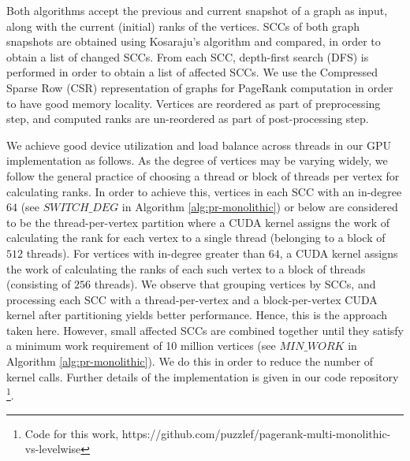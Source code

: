 



Both algorithms accept the previous and current snapshot of a graph as input, along with the current (initial) ranks of the vertices. SCCs of both graph snapshots are obtained using Kosaraju's algorithm and compared, in order to obtain a list of changed SCCs. From each SCC, depth-first search (DFS) is performed in order to obtain a list of affected SCCs. We use the Compressed Sparse Row (CSR) representation of graphs for PageRank computation in order to have good memory locality. Vertices are reordered as part of preprocessing step, and computed ranks are un-reordered as part of post-processing step.

We achieve good device utilization and load balance across threads in our GPU implementation as follows. As the degree of vertices may be varying widely, we follow the general practice of choosing a thread or block of threads per vertex for calculating ranks. In order to achieve this, vertices in each SCC with an in-degree $64$ (see $SWITCH\_DEG$ in Algorithm \ref{alg:pr-monolithic}) or below are considered to be the thread-per-vertex partition where a CUDA kernel assigns the work of calculating the rank for each vertex to a single thread (belonging to a block of $512$ threads). For vertices with in-degree greater than  $64$, a CUDA kernel assigns the work of calculating the ranks of each such vertex to a block of threads (consisting of $256$ threads). We observe that grouping vertices by SCCs, and processing each SCC with a thread-per-vertex and a block-per-vertex CUDA kernel after partitioning yields better performance. Hence, this is the approach taken here. However, small affected SCCs are combined together until they satisfy a minimum work requirement of 10 million vertices (see $MIN\_WORK$ in Algorithm \ref{alg:pr-monolithic}). We do this in order to reduce the number of kernel calls. Further details of the implementation is given in our code repository \footnote{Code for this work, https://github.com/puzzlef/pagerank-multi-monolithic-vs-levelwise}.

